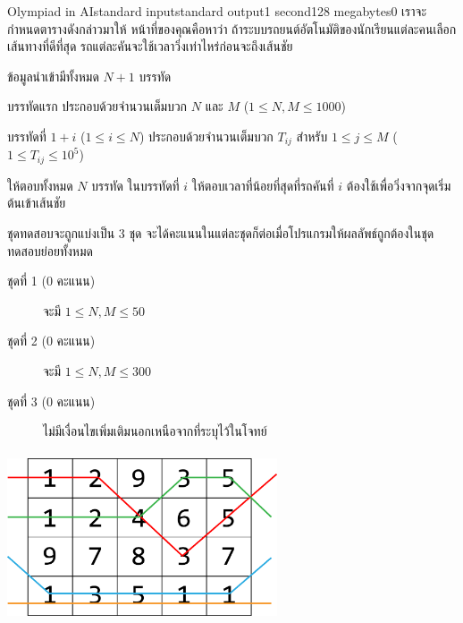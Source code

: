 \documentclass[11pt,a4paper]{article}
\begin{document}
\begin{problem}{Olympiad in AI}{standard input}{standard output}{1 second}{128 megabytes}{0}
เราจะกำหนดตารางดังกล่าวมาให้ หน้าที่ของคุณคือหาว่า ถ้าระบบรถยนต์อัตโนมัติของนักเรียนแต่ละคนเลือกเส้นทางที่ดีที่สุด รถแต่ละคันจะใช้เวลาวิ่งเท่าไหร่ก่อนจะถึงเส้นชัย

\InputFile
ข้อมูลนำเข้ามีทั้งหมด $N+1$ บรรทัด

บรรทัดแรก ประกอบด้วยจำนวนเต็มบวก $N$ และ $M$ ($1 \leq N, M \leq 1000$)

บรรทัดที่ $1+i$ ($1 \leq i \leq N$) ประกอบด้วยจำนวนเต็มบวก $T_{ij}$ สำหรับ $1 \leq j \leq M$ ($1 \leq T_{ij} \leq 10^5$)

\OutputFile
ให้ตอบทั้งหมด $N$ บรรทัด ในบรรทัดที่ $i$ ให้ตอบเวลาที่น้อยที่สุดที่รถคันที่ $i$ ต้องใช้เพื่อวิ่งจากจุดเริ่มต้นเข้าเส้นชัย

\Scoring
ชุดทดสอบจะถูกแบ่งเป็น 3 ชุด จะได้คะแนนในแต่ละชุดก็ต่อเมื่อโปรแกรมให้ผลลัพธ์ถูกต้องในชุดทดสอบย่อยทั้งหมด

\begin{description}

\item[ชุดที่ 1 (0 คะแนน)] จะมี $1 \leq N, M \leq 50$

\item[ชุดที่ 2 (0 คะแนน)] จะมี $1 \leq N, M \leq 300$

\item[ชุดที่ 3 (0 คะแนน)] ไม่มีเงื่อนไขเพิ่มเติมนอกเหนือจากที่ระบุไว้ในโจทย์

\end{description}

\Example

\begin{example}
%
\end{example}

\Note
\begin{center}
\includegraphics[width=8cm, height=5cm]{numtable.png}
\end{center}


\end{problem}
\end{document}
